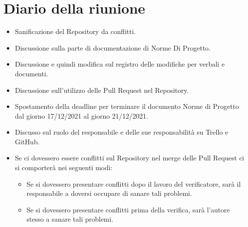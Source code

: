 \section{Diario della riunione}
\begin{itemize}
  \item Sanificazione del Repository da conflitti.
  \item Discussione sulla parte di documentazione di Norme Di Progetto.
  \item Discussione e quindi modifica sul registro delle modifiche per verbali e documenti.
  \item Discussione sull'utilizzo delle Pull Request nel Repository.
  \item Spostamento della deadline per terminare il documento Norme di Progetto dal giorno 17/12/2021 al giorno 21/12/2021.
  \item Discusso sul ruolo del responsabile e delle sue responsabilità su Trello e GitHub.
  \item Se ci dovessero essere conflitti sul Repository nel merge delle Pull Request ci si comporterà nei seguenti modi:
  \begin{itemize}
    \item Se si dovessero presentare conflitti dopo il lavoro del verificatore, sarà il responsabile a doversi occupare di sanare tali problemi.
    \item Se si dovessero presentare conflitti prima della verifica, sarà l'autore stesso a sanare tali problemi.
  \end{itemize}
\end{itemize}
